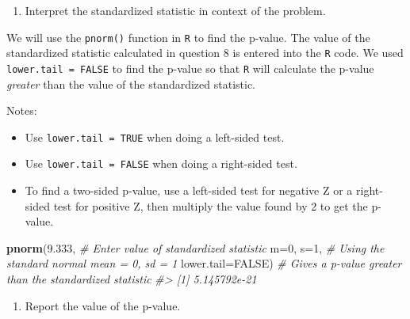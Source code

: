 \documentclass[
]{report}
\newenvironment{Shaded}{\begin{snugshade}}{\end{snugshade}}
\newcommand{\AttributeTok}[1]{\textcolor[rgb]{0.13,0.29,0.53}{#1}}
\newcommand{\CommentTok}[1]{\textcolor[rgb]{0.56,0.35,0.01}{\textit{#1}}}
\newcommand{\ConstantTok}[1]{\textcolor[rgb]{0.56,0.35,0.01}{#1}}
\newcommand{\DecValTok}[1]{\textcolor[rgb]{0.00,0.00,0.81}{#1}}
\newcommand{\FloatTok}[1]{\textcolor[rgb]{0.00,0.00,0.81}{#1}}
\newcommand{\FunctionTok}[1]{\textcolor[rgb]{0.13,0.29,0.53}{\textbf{#1}}}
\newcommand{\NormalTok}[1]{#1}
\providecommand{\tightlist}{%
  \setlength{\itemsep}{0pt}\setlength{\parskip}{0pt}}
\begin{document}
\newpage

\begin{enumerate}
\def\labelenumi{\arabic{enumi}.}
\setcounter{enumi}{7}
\tightlist
\item
  Interpret the standardized statistic in context of the problem.
\end{enumerate}

\vspace{1in}

We will use the \texttt{pnorm()} function in \texttt{R} to find the p-value. The value of the standardized statistic calculated in question 8 is entered into the \texttt{R} code. We used \texttt{lower.tail\ =\ FALSE} to find the p-value so that \texttt{R} will calculate the p-value \emph{greater} than the value of the standardized statistic.

Notes:

\begin{itemize}
\tightlist
\item
  Use \texttt{lower.tail\ =\ TRUE} when doing a left-sided test.
\item
  Use \texttt{lower.tail\ =\ FALSE} when doing a right-sided test.
\item
  To find a two-sided p-value, use a left-sided test for negative Z or a right-sided test for positive Z, then multiply the value found by 2 to get the p-value.
\end{itemize}

\begin{Shaded}
\begin{Highlighting}[]
\FunctionTok{pnorm}\NormalTok{(}\FloatTok{9.333}\NormalTok{, }\CommentTok{\# Enter value of standardized statistic}
      \AttributeTok{m=}\DecValTok{0}\NormalTok{, }\AttributeTok{s=}\DecValTok{1}\NormalTok{, }\CommentTok{\# Using the standard normal mean = 0, sd = 1}
      \AttributeTok{lower.tail=}\ConstantTok{FALSE}\NormalTok{) }\CommentTok{\# Gives a p{-}value greater than the standardized statistic}
\CommentTok{\#\textgreater{} [1] 5.145792e{-}21}
\end{Highlighting}
\end{Shaded}

\begin{enumerate}
\def\labelenumi{\arabic{enumi}.}
\setcounter{enumi}{8}
\tightlist
\item
  Report the value of the p-value.
\end{enumerate}

\vspace{0.1in}
\end{document}
